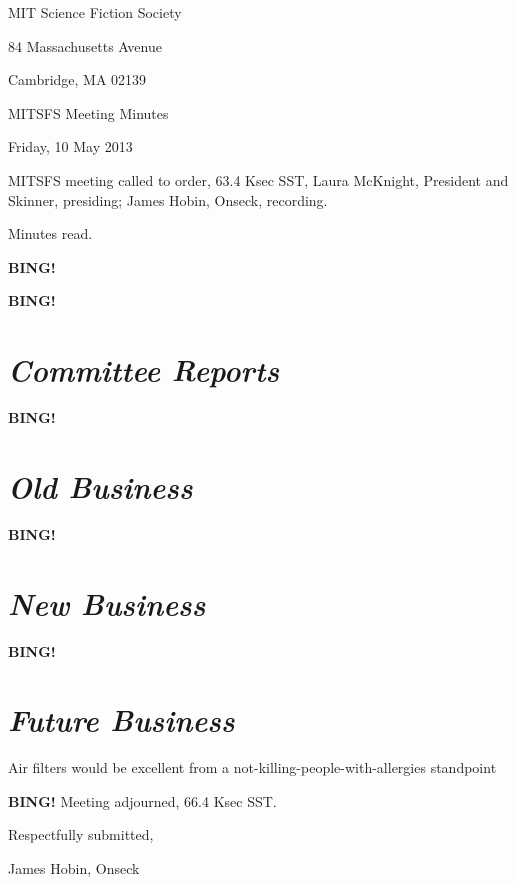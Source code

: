\documentclass[10pt]{article}
\newcommand{\bing}{{\bf BING!} }
\newcommand{\goto}[1]{\bing \vskip 12pt \section*{{\em{#1}}}}
\newcommand{\skinner}{Laura McKnight, President and Skinner}
\newcommand{\onseck}{James Hobin, Onseck}
\newcommand{\meetingdate}{Friday, 10 May 2013}
\begin{document}
\begin{center}

MIT Science Fiction Society

84 Massachusetts Avenue

Cambridge, MA 02139

\vspace{12pt}

MITSFS Meeting Minutes

\meetingdate

\end{center}

\vspace{18pt}

\setlength{\parskip}{6pt}

\noindent
MITSFS meeting called to order, 63.4 Ksec SST,
\skinner, presiding; \onseck, recording.

Minutes read.

\bing

\goto{Committee Reports}

\goto{Old Business}

\goto{New Business}

\goto{Future Business}
Air filters would be excellent from a not-killing-people-with-allergies standpoint

\bing
\noindent
Meeting adjourned, 66.4 Ksec SST.

\vspace{18pt}

\centerline{Respectfully submitted,}
\centerline{\onseck}
\end{document}
